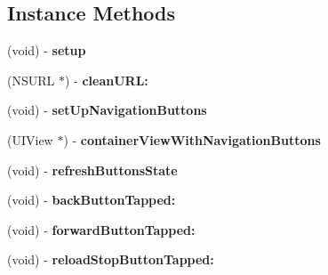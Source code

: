 \subsection*{Instance Methods}
\begin{DoxyCompactItemize}
\item 
\hypertarget{category_t_o_web_view_controller_07_08_a19a5b899f5765a33dcb4666be531c284}{}(void) -\/ {\bfseries setup}\label{category_t_o_web_view_controller_07_08_a19a5b899f5765a33dcb4666be531c284}

\item 
\hypertarget{category_t_o_web_view_controller_07_08_aa0e6393c120210b109171f4a6595a87b}{}(N\+S\+U\+R\+L $\ast$) -\/ {\bfseries clean\+U\+R\+L\+:}\label{category_t_o_web_view_controller_07_08_aa0e6393c120210b109171f4a6595a87b}

\item 
\hypertarget{category_t_o_web_view_controller_07_08_a30c9d57175f0ac902652b05bbe6a30cf}{}(void) -\/ {\bfseries set\+Up\+Navigation\+Buttons}\label{category_t_o_web_view_controller_07_08_a30c9d57175f0ac902652b05bbe6a30cf}

\item 
\hypertarget{category_t_o_web_view_controller_07_08_a6f5017c1da78d323d00fe3f0f317c6e1}{}(U\+I\+View $\ast$) -\/ {\bfseries container\+View\+With\+Navigation\+Buttons}\label{category_t_o_web_view_controller_07_08_a6f5017c1da78d323d00fe3f0f317c6e1}

\item 
\hypertarget{category_t_o_web_view_controller_07_08_aa08ea28cc42fbac8dfb052efcaa30443}{}(void) -\/ {\bfseries refresh\+Buttons\+State}\label{category_t_o_web_view_controller_07_08_aa08ea28cc42fbac8dfb052efcaa30443}

\item 
\hypertarget{category_t_o_web_view_controller_07_08_a6e743e79ffb27b6e2b93c7453cdecabe}{}(void) -\/ {\bfseries back\+Button\+Tapped\+:}\label{category_t_o_web_view_controller_07_08_a6e743e79ffb27b6e2b93c7453cdecabe}

\item 
\hypertarget{category_t_o_web_view_controller_07_08_a24272384272503539dd76d86db6b8f76}{}(void) -\/ {\bfseries forward\+Button\+Tapped\+:}\label{category_t_o_web_view_controller_07_08_a24272384272503539dd76d86db6b8f76}

\item 
\hypertarget{category_t_o_web_view_controller_07_08_a34c52dbc1233e005e8d9a8b51ae55d45}{}(void) -\/ {\bfseries reload\+Stop\+Button\+Tapped\+:}\label{category_t_o_web_view_controller_07_08_a34c52dbc1233e005e8d9a8b51ae55d45}


\end{DoxyCompactItemize}
